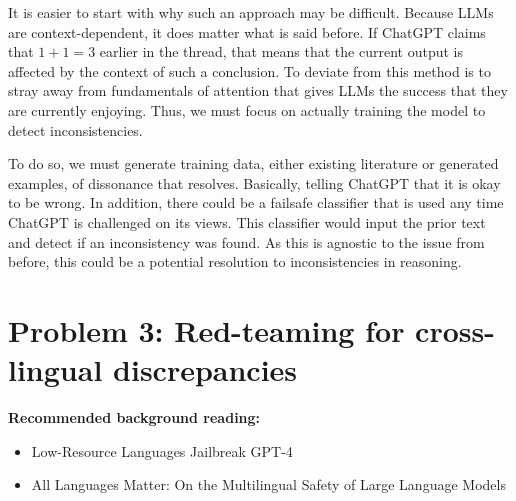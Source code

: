 \documentclass{article}
\begin{document}
\begin{enumerate}[label=(\alph*)]
    \bigskip

    \begin{mdframed}

        It is easier to start with why such an approach may be difficult. Because LLMs are context-dependent, it does matter what is said before. If ChatGPT claims that $1+1=3$ earlier in
        the thread, that means that the current output is affected by the context of such a conclusion. To deviate from this method is to stray away from 
        fundamentals of attention that gives LLMs the success that they are currently enjoying. Thus, we must focus on actually training the model to detect inconsistencies. 

        To do so, we must generate training data, either existing literature or generated examples, of dissonance that resolves. Basically, telling ChatGPT that it is okay to be wrong.
        In addition, there could be a failsafe classifier that is used any time ChatGPT is challenged on its views. This classifier would input the prior text and detect if an inconsistency was found. As this is agnostic
        to the issue from before, this could be a potential resolution to inconsistencies in reasoning. 
        
    \end{mdframed}
    
\end{enumerate}







\newpage

\section*{Problem 3: Red-teaming for cross-lingual discrepancies}


\textbf{Recommended background reading:}
\begin{itemize}
    \item Low-Resource Languages Jailbreak GPT-4 \citep{yong2023low}
    \item All Languages Matter: On the Multilingual Safety of Large Language Models \citep{wang2023all}
\end{itemize}
\end{document}
